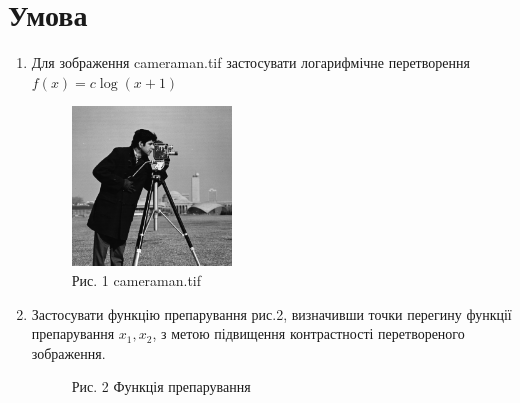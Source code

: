 \section*{Умова}

\begin{enumerate}
    \item Для зображення cameraman.tif застосувати логарифмічне перетворення
    $ f(x) = c \log(x + 1) $

    \begin{figure}[h]
        \begin{center}
            \includegraphics[width=0.4\textwidth]{cameraman.png}
            \caption*{Рис. 1 cameraman.tif}
        \end{center}
    \end{figure}

    \item Застосувати функцію препарування рис.2, визначивши точки перегину функції 
    препарування $x_{1}, x_{2}$, з метою підвищення контрастності перетвореного зображення.

    \begin{figure}[h]
        \begin{center}
            \caption*{Рис. 2 Функція препарування }
        \end{center}
    \end{figure}

\end{enumerate}

